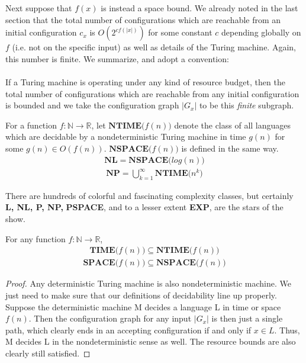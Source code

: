 \par Next suppose that $f(x)$ is instead a space bound. We already noted in the last section that the total number of configurations which are reachable from an initial configuration $c_x$ is $O(2^{cf(|x|)})$ for some constant $c$ depending globally on $f$ (i.e. not on the specific input) as well as details of the Turing machine. Again, this number is finite. We summarize, and adopt a convention: \\ \\
If a Turing machine is operating under any kind of resource budget, then the total number of configurations which are reachable from any initial configuration is bounded and we take the configuration graph $|G_x|$ to be this \textit{finite} subgraph.\\
\begin{definition}
For a function $f:\mathbb{N} \to \mathbb{R}$, let $\textbf{NTIME($f(n)$)}$ denote the class of all languages which are decidable by a nondeterministic Turing machine in time $g(n)$ for some $g(n) \in O(f(n))$.  $\textbf{NSPACE($f(n)$)}$ is defined in the same way.
\begin{align}
    \textbf{NL} = \textbf{NSPACE($log(n)$)}
\end{align}
\begin{align}
    \textbf{NP} = \bigcup_{k=1}^\infty \textbf{NTIME($n^k$)}
\end{align}
\end{definition}
There are hundreds of colorful and fascinating complexity classes, but certainly \textbf{L, NL, P, NP,} \textbf{PSPACE}, and to a lesser extent \textbf{EXP}, are the stars of the show. 
\begin{fact}
For any function $f:\mathbb{N} \to \mathbb{R}$,
\begin{align}
    \textbf{TIME($f(n)$)} \subseteq \textbf{NTIME($f(n)$)} 
\end{align}
\begin{align}
    \textbf{SPACE($f(n)$)} \subseteq \textbf{NSPACE($f(n)$)} 
\end{align}
\end{fact}
\begin{proof}
Any deterministic Turing machine is also nondeterministic machine. We just need to make sure that our definitions of decidability line up properly. Suppose the deterministic machine M decides a language L in time or space $f(n)$. Then the configuration graph for any input $|G_x|$ is then just a single path, which clearly ends in an accepting configuration if and only if $x \in L$. Thus, M decides L in the nondeterministic sense as well. The resource bounds are also clearly still satisfied.
\end{proof}
